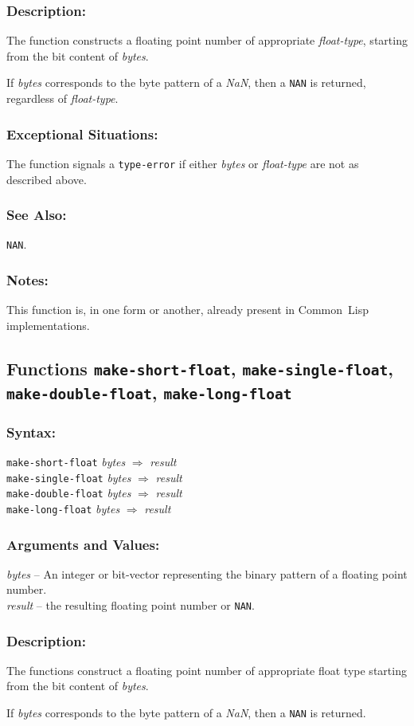 \documentclass[fleqn]{article}
\newcommand{\CL}{\textsf{Common~Lisp}}
\newcommand{\code}[1]{\texttt{#1}}
\newcommand{\varname}[1]{\textit{#1}}
\newcommand{\DDictionaryItem}[1]{\vspace*{6pt}\noindent\hrulefill\vspace*{-9pt}\subsection*{#1}}
\newcommand{\DSyntax}{\subsubsection*{Syntax:}}
\newcommand{\DDescription}{\subsubsection*{Description:}}
\newcommand{\DExceptional}{\subsubsection*{Exceptional Situations:}}
\newcommand{\DNotes}{\subsubsection*{Notes:}}
\newcommand{\DSeeAlso}{\subsubsection*{See Also:}}
\begin{document}
\DDescription{}

The function constructs a floating point number of appropriate
\varname{float-type}, starting from the bit content of
\varname{bytes}.

If \varname{bytes} corresponds to the byte pattern of a \emph{NaN},
then a \code{NAN} is returned, regardless of \varname{float-type}.

\DExceptional{}

The function signals a \code{type-error} if either \varname{bytes} or
\varname{float-type} are not as described above.

\DSeeAlso{}

\code{NAN}.


\DNotes{}

This function is, in one form or another, already present in \CL{}
implementations.


\DDictionaryItem{Functions
  \code{make-short-float},
  \code{make-single-float},\\
  \code{make-double-float},
  \code{make-long-float}}

\DSyntax{}

\code{make-short-float} \varname{bytes}
$\Rightarrow$ \varname{result}\\
\code{make-single-float} \varname{bytes}
$\Rightarrow$ \varname{result}\\
\code{make-double-float} \varname{bytes}
$\Rightarrow$ \varname{result}\\
\code{make-long-float} \varname{bytes}
$\Rightarrow$ \varname{result}

\subsubsection*{Arguments and Values:}

\varname{bytes} -- An integer or bit-vector representing the binary
pattern of a floating point number.\\
\varname{result} -- the resulting floating point number or \code{NAN}.

\subsubsection*{Description:}

The functions construct a floating point number of appropriate
float type starting from the bit content of
\varname{bytes}.

If \varname{bytes} corresponds to the byte pattern of a \emph{NaN},
then a \code{NAN} is returned.
\end{document}
